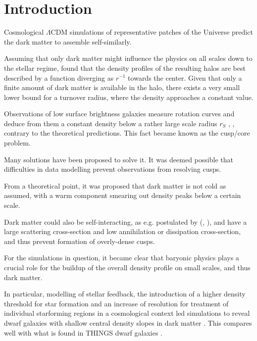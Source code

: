 
\section{Introduction}\label{sec:introduction}


Cosmological $\Lambda$CDM simulations of representative patches of the
Universe predict the dark matter to assemble self-similarly.

Assuming that only dark matter might influence the physics on all
scales down to the stellar regime, \citet{Navarro+1997} found that the
density profiles of the resulting halos are best described by a
function diverging as $r^{-1}$ towards the center. Given that only a
finite amount of dark matter is available in the halo, there exists a
very small lower bound for a turnover radius, where the density
approaches a constant value.

Observations of low surface brightness galaxies measure rotation
curves and deduce from them a constant density below a rather large
scale radius $r_S$ , , contrary to
the theoretical predictions. This fact became known as the cusp/core problem.



Many solutions have been proposed to solve it. It was deemed possible
that difficulties in data modelling prevent observations from
resolving cusps.


From a theoretical point, it was proposed that dark matter is not cold
as assumed, with a warm component smearing out density peaks below a
certain scale.

Dark matter could also be self-interacting, as e.g. postulated by
(\citet{SpergelSteinhardt2000}, \citet{Vogelsberger+2012}), and have a
large scattering cross-section and low annihilation or dissipation
cross-section, and thus prevent formation of overly-dense cusps.


For the simulations in question, it became clear that baryonic physics
plays a crucial role for the buildup of the overall density profile on
small scales, and thus dark matter.

In particular, modelling of stellar feedback, the introduction of a
higher density threshold for star formation and an increase of
resolution for treatment of individual starforming regions in a
cosmological context led simulations to reveal dwarf galaxies with
shallow central density slopes in dark matter
. This compares well with what is found in
THINGS dwarf galaxies .



